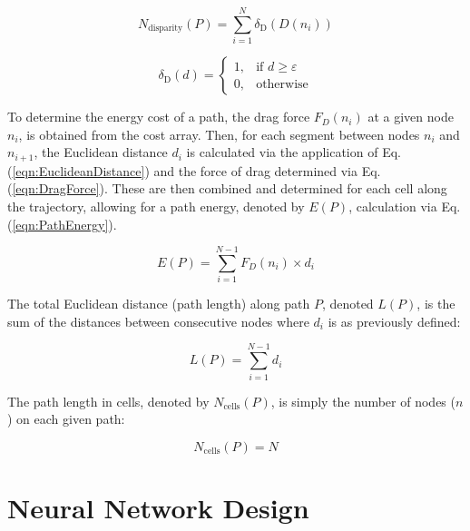\documentclass[final,5p,times,twocolumn]{elsarticle}
\begin{document}
\begin{equation}
\label{eqn:PathTurbulence}
   N_{\text{disparity}}(P) = \sum_{i=1}^{N} \delta_{\text{D}}(D(n_i)) 
\end{equation}

\begin{equation}
\label{eqn:PathTurbulenceCutOff}
    \delta_{\text{D}}(d) =
    \begin{cases}
    1, & \text{if } d \geq \varepsilon \\
    0, & \text{otherwise}
    \end{cases}
\end{equation}

To determine the energy cost of a path, the drag force $F_D(n_i)$ at a given node $n_i$, is obtained from the cost array. Then, for each segment between nodes $n_i$ and $n_{i+1}$, the Euclidean distance $d_i$ is calculated via the application of Eq. (\ref{eqn:EuclideanDistance}) and the force of drag determined via Eq. (\ref{eqn:DragForce}). These are then combined and determined for each cell along the trajectory, allowing for a path energy, denoted by $E(P)$, calculation via Eq. (\ref{eqn:PathEnergy}).

\begin{equation}
\label{eqn:PathEnergy}
    E(P) = \sum_{i=1}^{N-1} F_D(n_i) \times d_i    
\end{equation}

The total Euclidean distance (path length) along path  $P$, denoted $L(P)$, is the sum of the distances between consecutive nodes where $d_i$ is as previously defined:

\begin{equation}
   L(P) = \sum_{i=1}^{N-1} d_i 
\end{equation}

The path length in cells, denoted by $N_{\text{cells}}(P)$, is simply the number of nodes ($n$) on each given path:

\begin{equation}
    N_{\text{cells}}(P) = N
\end{equation}


\section{Neural Network Design} %
\label{Neural Network Design}
\end{document}
